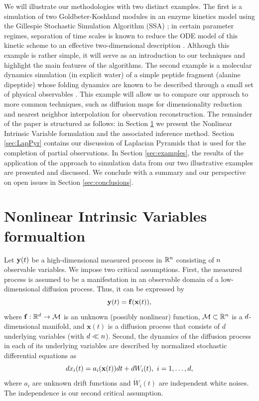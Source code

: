 We will illustrate our methodologies with two distinct examples.
%
The first is a simulation
of two Goldbeter-Koshland modules in an enzyme kinetics model using the Gillespie Stochastic Simulation
Algorithm (SSA) \cite{gillespie1977exact};
in certain parameter regimes, separation of time scales is known
to reduce the ODE model of this kinetic scheme to an effective two-dimensional description \cite{zagaris2012stability}.
%
Although this example is rather simple, it will serve as an introduction to our techniques and highlight the main features of the algorithms.
%
The second example is a molecular dynamics
simulation (in explicit water) of a simple peptide fragment (alanine dipeptide) whose folding
dynamics are known to be described through a small set of physical observables \cite{bolhuis2000reaction}.
%
This example will allow us to compare our approach to more common techniques,
such as diffusion maps \cite{coifman2005geometric} for dimensionality reduction
and nearest neighbor interpolation for observation reconstruction.
%
The remainder of the paper is structured as follows: in Section \ref{sec:NIV} we present the Nonlinear Intrinsic Variable formulation and
the associated inference method.
%
Section \ref{sec:LapPyr} contains our discussion of Laplacian Pyramids that
is used for the completion of partial observations.
%
In Section \ref{sec:examples}, the results
of the application of the approach to simulation data from our two illustrative examples are presented and discussed.
%
We conclude with a summary and our perspective on open issues in Section \ref{sec:conclusions}.

\section{Nonlinear Intrinsic Variables formualtion} \label{sec:NIV}

Let $\mathbf{y}(t)$ be a high-dimensional measured process in $\mathbb{R}^n$ consisting of $n$ observable variables.
%
We impose two critical assumptions. First, the measured process is assumed to be a manifestation in an observable domain of a low-dimensional diffusion process. Thus, it can be expressed by
\begin{equation}
	\mathbf{y}(t) = \mathbf{f}(\mathbf{x}(t)),
\end{equation}
where $\mathbf{f}:\mathbb{R}^d \rightarrow \mathcal{M}$ is an unknown (possibly nonlinear) function, $\mathcal{M} \subset \mathbb{R}^n$ is a $d$-dimensional manifold,
and $\mathbf{x}(t)$ is a diffusion process that consists of $d$ underlying variables (with $d \ll n$).
%
Second, the dynamics of the diffusion process in each of its underlying variables are described by normalized stochastic differential equations as
\begin{equation}
	d x_i(t) = a_i (\mathbf{x}(t)) dt + d W_i(t), \ i=1,\ldots,d,
	\label{eq:dynamics}
\end{equation}
where $a_i$ are unknown drift functions and $\dot{W}_i(t)$ are independent white noises.
%
The independence is our second critical assumption.

